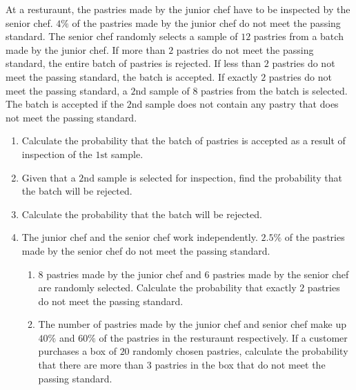 \documentclass[11pt,a4paper]{book}
\begin{document}
\begin{example}

At a resturaunt, the pastries made by the junior chef have to be inspected
by the senior chef. $4\%$ of the pastries made by the junior chef
do not meet the passing standard. The senior chef randomly selects
a sample of $12$ pastries from a batch made by the junior chef. If
more than $2$ pastries do not meet the passing standard, the entire
batch of pastries is rejected. If less than $2$ pastries do not meet
the passing standard, the batch is accepted. If exactly $2$ pastries
do not meet the passing standard, a $2\text{nd}$ sample of $8$ pastries
from the batch is selected. The batch is accepted if the $2\text{nd}$
sample does not contain any pastry that does not meet the passing
standard.

\begin{enumerate}[label=(\alph*)] 

\item  Calculate the probability that the batch of pastries is accepted
as a result of inspection of the $1\text{st}$ sample.

\item  Given that a $2\text{nd}$ sample is selected for inspection,
find the probability that the batch will be rejected.

\item  Calculate the probability that the batch will be rejected.

\item  The junior chef and the senior chef work independently. $2.5\%$
of the pastries made by the senior chef do not meet the passing standard.

\begin{enumerate}[label=(\roman*)] 

\item  $8$ pastries made by the junior chef and $6$ pastries made
by the senior chef are randomly selected. Calculate the probability
that exactly $2$ pastries do not meet the passing standard.

\item  The number of pastries made by the junior chef and senior
chef make up $40\%$ and $60\%$ of the pastries in the resturaunt
respectively. If a customer purchases a box of $20$ randomly chosen
pastries, calculate the probability that there are more than $3$
pastries in the box that do not meet the passing standard.

\end{enumerate}


\end{enumerate}
\end{example}
\end{document}
